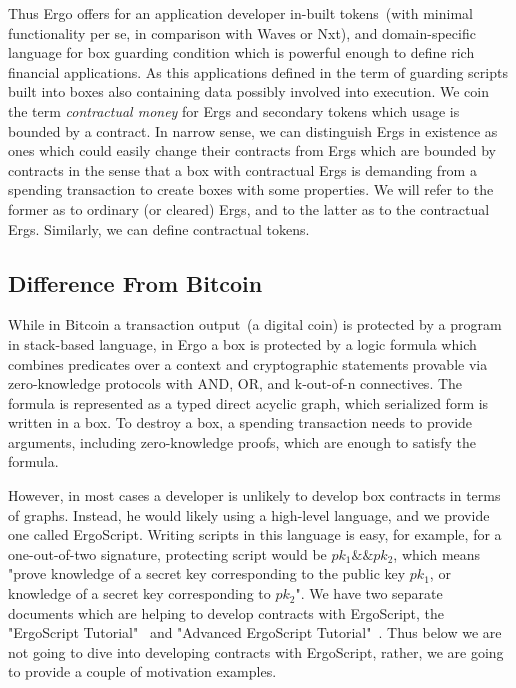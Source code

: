  Thus Ergo offers for an application developer in-built tokens~(with minimal functionality per se, in comparison with
 Waves or Nxt), and domain-specific language for box guarding condition which is powerful enough to define rich
 financial applications. As this applications defined in the term of guarding scripts built into boxes also containing
 data possibly involved into execution. We coin the term {\em contractual money} for Ergs and secondary tokens which
 usage is bounded by a contract. In narrow sense, we can distinguish Ergs in existence as ones which could easily
 change their contracts from Ergs which are bounded by contracts in the sense that a box with contractual Ergs is
 demanding from a spending transaction to create boxes with some properties. We will refer to the former as to ordinary
 (or cleared) Ergs, and to the latter as to the contractual Ergs. Similarly, we can define contractual tokens.

\subsection{Difference From Bitcoin}

 While in Bitcoin a transaction output~(a digital coin) is protected by a program in stack-based language, in Ergo a
 box is protected by a logic formula which combines predicates over a context and cryptographic statements provable
 via zero-knowledge protocols with AND, OR, and k-out-of-n connectives. The formula is represented as a typed direct
 acyclic graph, which serialized form is written in a box. To destroy a box, a spending transaction needs to provide
 arguments, including zero-knowledge proofs, which are enough to satisfy the formula.

 However, in most cases a developer is unlikely to develop box contracts in terms of graphs. Instead, he would likely
 using a high-level language, and we provide one called ErgoScript. Writing scripts in this language is easy, for
 example, for a one-out-of-two signature, protecting script would be ${pk_1 \&\& pk_2}$, which means "prove knowledge of
 a secret key corresponding to the public key $pk_1$, or knowledge of a secret key corresponding to $pk_2$". We have
 two separate documents which are helping to develop contracts with ErgoScript, the "ErgoScript Tutorial"~\cite{}
 and "Advanced ErgoScript Tutorial"~\cite{}. Thus below we are not going to dive into developing contracts with
 ErgoScript, rather, we are going to provide a couple of motivation examples.

